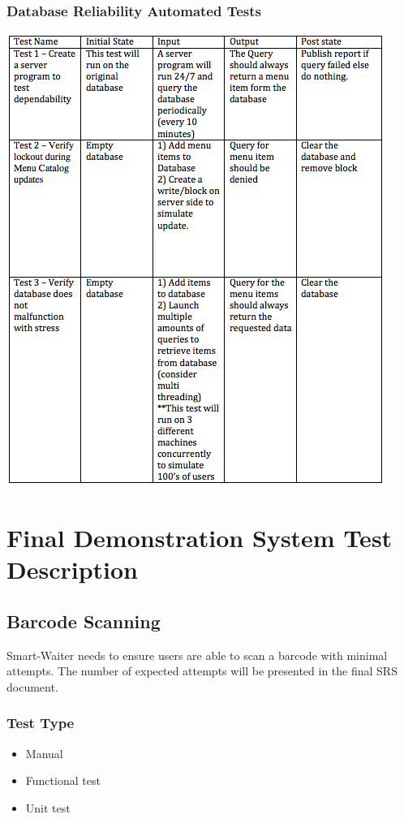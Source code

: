 \documentclass[12pt]{article}
\begin{document}
\subsubsection{Database Reliability Automated Tests }
\includegraphics[width=\textwidth,height=\textheight,keepaspectratio]{reliability_tests.png}

\section{Final Demonstration System Test Description}

\subsection{Barcode Scanning}
Smart-Waiter needs to ensure users are able to scan a barcode with minimal attempts. The number of expected attempts will be presented in the final SRS document.

\subsubsection{Test Type}
\begin{itemize}
  \item Manual
  \item Functional test
  \item Unit test
\end{itemize}
\end{document}
